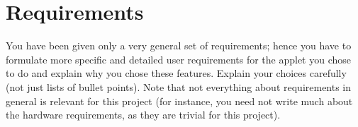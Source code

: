 
\chapter{Requirements}
\label{cha:requirements}

You have been given only a very general set of requirements; hence
you have to formulate more specific and detailed user requirements
for the applet you chose to do and explain why you chose these
features. Explain your choices carefully (not just lists of bullet
points). Note that not everything about requirements in general is
relevant for this project (for instance, you need not write much
about the hardware requirements, as they are trivial for this
project).
